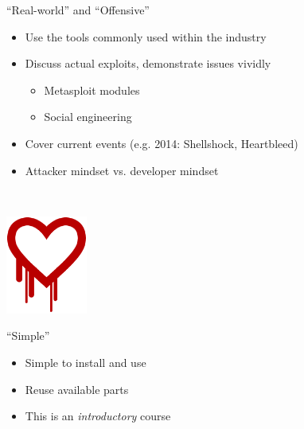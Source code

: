\documentclass{beamer}
\begin{document}
	\begin{frame}{``Real-world'' and ``Offensive''}
		\begin{itemize}
			\item Use the tools commonly used within the industry	
			\item Discuss actual exploits, demonstrate issues vividly
			\begin{itemize}
				\item Metasploit modules
				\item Social engineering
			\end{itemize}
			\item Cover current events (e.g. 2014: Shellshock, Heartbleed)
			\item Attacker mindset vs. developer mindset
		\end{itemize}		
		~
		\begin{center}
			\includegraphics[width=0.2\textwidth]{heartbleed.png}
		\end{center}
	\end{frame}

	\begin{frame}{``Simple''}
		\begin{itemize}
			\item Simple to install and use
			\item Reuse available parts
			\item This is an {\em introductory} course
		\end{itemize}	
	\end{frame}
		
\end{document}
